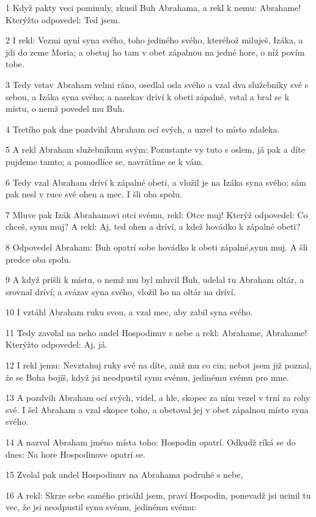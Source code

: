 \par 1 Když pakty veci pominuly, zkusil Buh Abrahama, a rekl k nemu: Abrahame! Kterýžto odpovedel: Ted jsem.
\par 2 I rekl: Vezmi nyní syna svého, toho jediného svého, kteréhož miluješ, Izáka, a jdi do zeme Moria; a obetuj ho tam v obet zápalnou na jedné hore, o níž povím tobe.
\par 3 Tedy vstav Abraham velmi ráno, osedlal osla svého a vzal dva služebníky své s sebou, a Izáka syna svého; a nasekav dríví k obeti zápalné, vstal a bral se k místu, o nemž povedel mu Buh.
\par 4 Tretího pak dne pozdvihl Abraham ocí svých, a uzrel to místo zdaleka.
\par 5 A rekl Abraham služebníkum svým: Pozustante vy tuto s oslem, já pak a díte pujdeme tamto; a pomodlíce se, navrátíme se k vám.
\par 6 Tedy vzal Abraham dríví k zápalné obeti, a vložil je na Izáka syna svého; sám pak nesl v ruce své ohen a mec. I šli oba spolu.
\par 7 Mluve pak Izák Abrahamovi otci svému, rekl: Otce muj! Kterýž odpovedel: Co chceš, synu muj? A rekl: Aj, ted ohen a dríví, a kdež hovádko k zápalné obeti?
\par 8 Odpovedel Abraham: Buh opatrí sobe hovádko k obeti zápalné,synu muj. A šli predce oba spolu.
\par 9 A když prišli k místu, o nemž mu byl mluvil Buh, udelal tu Abraham oltár, a srovnal dríví; a svázav syna svého, vložil ho na oltár na dríví.
\par 10 I vztáhl Abraham ruku svou, a vzal mec, aby zabil syna svého.
\par 11 Tedy zavolal na neho andel Hospodinuv s nebe a rekl: Abrahame, Abrahame! Kterýžto odpovedel: Aj, já.
\par 12 I rekl jemu: Nevztahuj ruky své na díte, aniž mu co cin; nebot jsem již poznal, že se Boha bojíš, když jsi neodpustil synu svému, jedinému svému pro mne.
\par 13 A pozdvih Abraham ocí svých, videl, a hle, skopec za ním vezel v trní za rohy své. I šel Abraham a vzal skopce toho, a obetoval jej v obet zápalnou místo syna svého.
\par 14 A nazval Abraham jméno místa toho: Hospodin opatrí. Odkudž ríká se do dnes: Na hore Hospodinove opatrí se.
\par 15 Zvolal pak andel Hospodinuv na Abrahama podruhé s nebe,
\par 16 A rekl: Skrze sebe samého prisáhl jsem, praví Hospodin, ponevadž jsi ucinil tu vec, že jsi neodpustil synu svému, jedinému svému:

